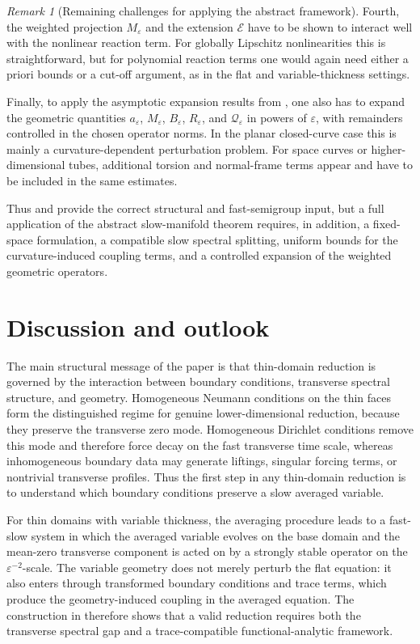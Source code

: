 \documentclass[11pt]{article}
\theoremstyle{definition}
\theoremstyle{remark}
\newtheorem{remark}[theorem]{Remark}
\numberwithin{equation}{section}
\begin{document}
\begin{remark}[Remaining challenges for applying the abstract framework]
Fourth, the weighted projection \(M_\varepsilon\) and the extension
\(\mathcal E\) have to be shown to interact well with the nonlinear reaction
term. For globally Lipschitz nonlinearities this is straightforward, but for
polynomial reaction terms one would again need either a priori bounds or a
cut-off argument, as in the flat and variable-thickness settings.

Finally, to apply the asymptotic expansion results from
, one also has to expand the geometric quantities
\(a_\varepsilon\), \(M_\varepsilon\), \(B_\varepsilon\), \(R_\varepsilon\),
and \(\mathcal Q_\varepsilon\) in powers of \(\varepsilon\), with remainders
controlled in the chosen operator norms. In the planar closed-curve case this
is mainly a curvature-dependent perturbation problem. For space curves or
higher-dimensional tubes, additional torsion and normal-frame terms appear
and have to be included in the same estimates.

Thus  and  provide the
correct structural and fast-semigroup input, but a full application of the
abstract slow-manifold theorem requires, in addition, a fixed-space
formulation, a compatible slow spectral splitting, uniform bounds for the
curvature-induced coupling terms, and a controlled expansion of the weighted
geometric operators.
\end{remark}

\section{Discussion and outlook}\label{sec:discussion}

The main structural message of the paper is that thin-domain reduction is
governed by the interaction between boundary conditions, transverse spectral
structure, and geometry. Homogeneous Neumann conditions on the thin faces form
the distinguished regime for genuine lower-dimensional reduction, because
they preserve the transverse zero mode. Homogeneous Dirichlet conditions
remove this mode and therefore force decay on the fast transverse time scale,
whereas inhomogeneous boundary data may generate liftings, singular forcing
terms, or nontrivial transverse profiles. Thus the first step in any
thin-domain reduction is to understand which boundary conditions preserve a
slow averaged variable.

For thin domains with variable thickness, the averaging procedure leads to a
fast-slow system in which the averaged variable evolves on the base domain
and the mean-zero transverse component is acted on by a strongly stable
operator on the \(\varepsilon^{-2}\)-scale. The variable geometry does not
merely perturb the flat equation: it also enters through transformed boundary
conditions and trace terms, which produce the geometry-induced coupling in the
averaged equation. The construction in 
therefore shows that a valid reduction requires both the transverse spectral
gap and a trace-compatible functional-analytic framework.
\end{document}
